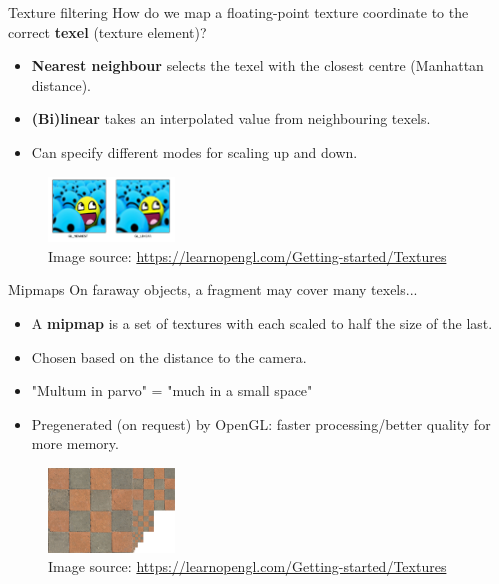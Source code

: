 \begin{frame}{Texture filtering}
	How do we map a floating-point texture coordinate to the correct \textbf{texel} (texture element)?
	\begin{itemize}
		\pause\item \textbf{Nearest neighbour} selects the texel with the closest centre (Manhattan distance).
		\pause\item \textbf{(Bi)linear} takes an interpolated value from neighbouring texels.
		\pause\item Can specify different modes for scaling up and down.
	\end{itemize}
	\begin{center}
		\begin{figure}[h!]
			\pause\includegraphics[width=0.3\textwidth]{texture_filtering}
			\caption*{Image source: \url{https://learnopengl.com/Getting-started/Textures}}
		\end{figure}
	\end{center}
\end{frame}

\begin{frame}{Mipmaps}
	On faraway objects, a fragment may cover many texels...
	\begin{itemize}	
		\pause\item A \textbf{mipmap} is a set of textures with each scaled to half the size of the last.
		\pause\item Chosen based on the distance to the camera.
		\pause\item "Multum in parvo" = "much in a small space"
		\pause\item Pregenerated (on request) by OpenGL: faster processing/better quality for more memory.
	\end{itemize}
	\begin{center}
		\begin{figure}[h!]
			\pause\includegraphics[width=0.3\textwidth]{mipmaps}
			\caption*{Image source: \url{https://learnopengl.com/Getting-started/Textures}}
		\end{figure}
	\end{center}
\end{frame}

